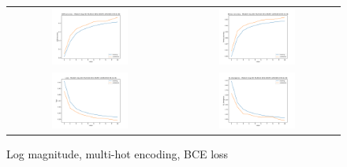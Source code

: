 \begin{appendices}
        \begin{figure}[H]
            \centering
            \begin{tabular}{cc}
                \includegraphics[width=0.48\textwidth]{figures/training_plots/ModelC-(log_2D)-MultiHot-BCE-ADAM_13-04-2019_00-21-46_AON-accuracy.pdf} & \includegraphics[width=0.48\textwidth]{figures/training_plots/ModelC-(log_2D)-MultiHot-BCE-ADAM_13-04-2019_00-21-46_binary-accuracy.pdf} \\
                \includegraphics[width=0.48\textwidth]{figures/training_plots/ModelC-(log_2D)-MultiHot-BCE-ADAM_13-04-2019_00-21-46_loss.pdf} & \includegraphics[width=0.48\textwidth]{figures/training_plots/ModelC-(log_2D)-MultiHot-BCE-ADAM_13-04-2019_00-21-46_KL-divergence.pdf}
            \end{tabular}
            \caption*{Log magnitude, multi-hot encoding, BCE loss}
        \end{figure}
        

\end{appendices}
